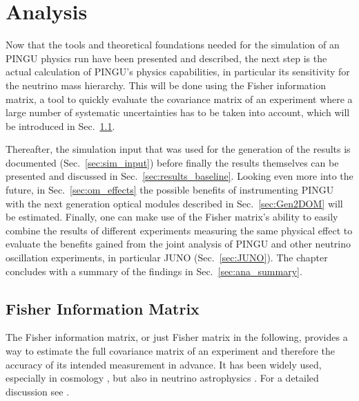 \chapter{Analysis}
\label{sec:ana}

Now that the tools and theoretical foundations needed for the simulation of an
PINGU physics run have been presented and described, the next step is the
actual calculation of PINGU's physics capabilities, in particular its
sensitivity for the neutrino mass hierarchy. This will be done using the Fisher
information matrix, a tool to quickly evaluate the covariance matrix of an
experiment where a large number of systematic uncertainties has to be taken
into account, which will be introduced in Sec.~\ref{sec:fisher}.

Thereafter, the simulation input that was used for the generation of the
results is documented (Sec.~\ref{sec:sim_input}) before finally the results
themselves can be presented and discussed in Sec.~\ref{sec:results_baseline}.
Looking even more into the future, in Sec.~\ref{sec:om_effects} 
the possible benefits of instrumenting PINGU with the next generation optical
modules described in Sec.~\ref{sec:Gen2DOM} will be estimated. Finally, one can
make use of the
Fisher matrix's ability to easily combine the results of different experiments
measuring the same physical effect to evaluate the benefits gained from the
joint analysis of PINGU and other neutrino oscillation experiments, in
particular JUNO \cite{JUNO} (Sec.~\ref{sec:JUNO}). The chapter concludes with a
summary of the findings in Sec.~\ref{sec:ana_summary}.


\section{Fisher Information Matrix}
\label{sec:fisher}

The Fisher information matrix, or just Fisher matrix in the following, provides
a way to estimate the full covariance matrix of an experiment and therefore the
accuracy of its intended measurement in advance. It has been widely used,
especially in cosmology \cite{Fisher_first}, but also in neutrino
astrophysics \cite{MarekDiffuse}. For a detailed discussion see \eg
\cite{Fisher_first, DETF, DETF2}.

